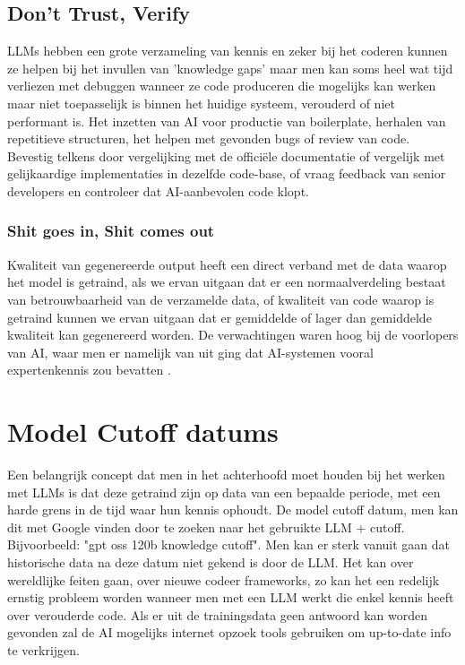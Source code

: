 \subsection{Don't Trust, Verify}
\label{ssec:donttrustverify}
LLMs hebben een grote verzameling van kennis en zeker bij het coderen kunnen ze helpen bij het invullen van 'knowledge gaps' maar men kan soms heel wat tijd verliezen met debuggen wanneer ze code produceren die mogelijks kan werken maar niet toepasselijk is binnen het huidige systeem, verouderd of niet performant is. Het inzetten van AI voor productie van boilerplate, herhalen van repetitieve structuren, het helpen met gevonden bugs of review van code. Bevestig telkens door vergelijking met de officiële documentatie of vergelijk met gelijkaardige implementaties in dezelfde code-base, of vraag feedback van senior developers en controleer dat AI-aanbevolen code klopt. \\

\subsubsection{Shit goes in, Shit comes out}
\label{sssec:shitgoesinshitcomesout}
Kwaliteit van gegenereerde output heeft een direct verband met de data waarop het model is getraind, als we ervan uitgaan dat er een normaalverdeling bestaat van betrouwbaarheid van de verzamelde data, of kwaliteit van code waarop is getraind kunnen we ervan uitgaan dat er gemiddelde of lager dan gemiddelde kwaliteit kan gegenereerd worden. De verwachtingen waren hoog bij de voorlopers van AI, waar men er namelijk van uit ging dat AI-systemen vooral expertenkennis zou bevatten \autocite{ComputerChronicles1984}.

\section{Model Cutoff datums}
\label{sec:modelcutoffdatums}


Een belangrijk concept dat men in het achterhoofd moet houden bij het werken met LLMs is dat deze getraind zijn op data van een bepaalde periode, met een harde grens in de tijd waar hun kennis ophoudt. De model cutoff datum, men kan dit met Google vinden door te zoeken naar het gebruikte LLM + cutoff. Bijvoorbeeld: "gpt oss 120b knowledge cutoff". Men kan er sterk vanuit gaan dat historische data na deze datum niet gekend is door de LLM. Het kan over wereldlijke feiten gaan, over nieuwe codeer frameworks, zo kan het een redelijk ernstig probleem worden wanneer men met een LLM werkt die enkel kennis heeft over verouderde code. Als er uit de trainingsdata geen antwoord kan worden gevonden zal de AI mogelijks  internet opzoek tools gebruiken om up-to-date info te verkrijgen. \\

